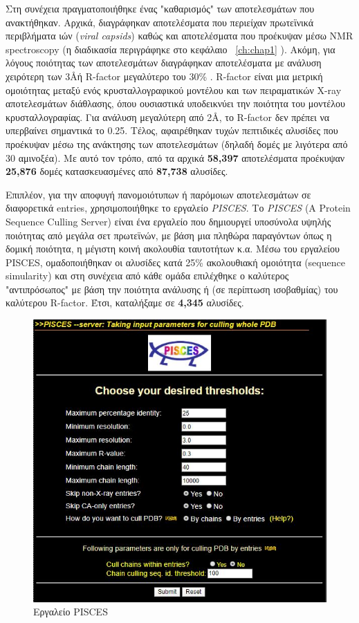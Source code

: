 \medskip
Στη συνέχεια πραγματοποιήθηκε ένας "καθαρισμός" των αποτελεσμάτων που ανακτήθηκαν. Αρχικά, διαγράφηκαν αποτελέσματα που περιείχαν πρωτεϊνικά περιβλήματα ιών (\textit{viral capsids}) καθώς και αποτελέσματα που προέκυψαν μέσω NMR spectroscopy (η διαδικασία περιγράφηκε στο κεφάλαιο ~\ref{ch:chap1} ). Ακόμη, για λόγους ποιότητας των αποτελεσμάτων διαγράφηκαν αποτελέσματα με ανάλυση χειρότερη των 3\AA   ή R-factor μεγαλύτερο του 30\% . R-factor είναι μια μετρική ομοιότητας μεταξύ ενός κρυσταλλογραφικού μοντέλου και των πειραματικών X-ray αποτελεσμάτων διάθλασης, όπου ουσιαστικά υποδεικνύει την ποιότητα του μοντέλου κρυσταλλογραφίας. Για ανάλυση μεγαλύτερη από 2\AA, το R-factor δεν πρέπει να υπερβαίνει σημαντικά το 0.25. Τέλος, αφαιρέθηκαν τυχών πεπτιδικές αλυσίδες που προέκυψαν μέσω της ανάκτησης των αποτελεσμάτων (δηλαδή δομές με λιγότερα από 30 αμινοξέα). Με αυτό τον τρόπο, από τα αρχικά \textbf{58,397} αποτελέσματα προέκυψαν \textbf{25,876} δομές κατασκευασμένες από \textbf{87,738} αλυσίδες.

\medskip
Επιπλέον, για την αποφυγή πανομοιότυπων ή παρόμοιων αποτελεσμάτων σε διαφορετικά entries, χρησιμοποιήθηκε το εργαλείο \textit{PISCES}. Το \textit{PISCES} (A Protein Sequence Culling Server) είναι ένα εργαλείο που δημιουργεί υποσύνολα υψηλής ποιότητας από μεγάλα σετ πρωτεϊνών, με βάση μια πληθώρα παραγόντων όπως η δομική ποιότητα, η μέγιστη κοινή ακολουθία ταυτοτήτων κ.α. Μέσω του εργαλείου PISCES, ομαδοποιήθηκαν οι αλυσίδες κατά 25\% ακολουθιακή ομοιότητα (sequence simularity) και στη συνέχεια από κάθε ομάδα επιλέχθηκε ο καλύτερος "αντιπρόσωπος" με βάση την ποιότητα ανάλυσης ή (σε περίπτωση ισοβαθμίας) του καλύτερου R-factor. Έτσι, καταλήξαμε σε \textbf{4,345} αλυσίδες.


\begin{figure}[h]
  \centering
  \includegraphics[scale=0.8]{images/PISCES.JPG}
  \caption{Εργαλείο PISCES}
  \label{fig:PISCES}
\end{figure}

